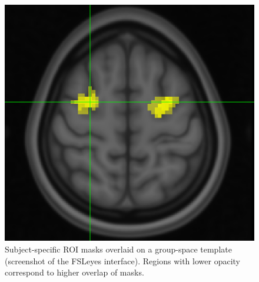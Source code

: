 \documentclass[a4paper, 12pt]{scrreprt}
\begin{document}
\begin{figure}[H]
	\includegraphics[scale=0.5]{img/FEF_masks_overlaid_v2.png}
	\caption[]{\small{Subject-specific ROI masks overlaid on a group-space template (screenshot of the FSLeyes interface). Regions with lower opacity correspond to higher overlap of masks.}}
	\label{fig:FEF}
\end{figure}
\end{document}
